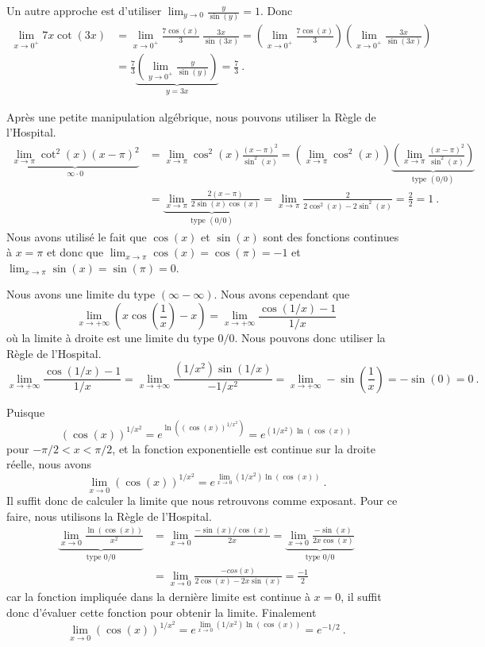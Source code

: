 {Un autre approche est d'utiliser
$\displaystyle \lim_{y\to 0} \frac{y}{\sin(y)} = 1$.  Donc
\begin{align*}
\lim_{x\to 0^+} 7x \cot(3x) &
= \lim_{x\to 0^+} \frac{7\cos(x)}{3}\ \frac{3x}{\sin(3x)}
= \left(\lim_{x\to 0^+} \frac{7\cos(x)}{3}\right)
\left( \lim_{x\to 0^+}\frac{3x}{\sin(3x)}\right) \\
&= \frac{7}{3} \underbrace{\left(\lim_{y\to 0^+}\frac{y}{\sin(y)}\right)}_{y=3x}
= \frac{7}{3} \ .
\end{align*}

 Après une petite manipulation algébrique, nous pouvons
utiliser la Règle de l'Hospital.
\begin{align*}
\underbrace{\lim_{x\to \pi} \cot^2(x) (x-\pi)^2}_{\infty \cdot 0} &
= \lim_{x\to \pi} \cos^2(x) \frac{(x-\pi)^2}{\sin^2(x)}
= \left( \lim_{x\to \pi} \cos^2(x) \right)
\underbrace{\left(\lim_{x\to \pi}\frac{(x-\pi)^2}{\sin^2(x)
}\right)}_{ \text{type }(0/0)} \\
&= \underbrace{\lim_{x\to  \pi}
\frac{2(x-\pi)}{2\sin(x)\cos(x)}}_{\text{type }(0/0)}
= \lim_{x\to \pi}\frac{2}{2\cos^2(x) - 2\sin^2(x)} = \frac{2}{2} = 1 \ . 
\end{align*}
Nous avons utilisé le fait que $\cos(x)$ et $\sin(x)$ sont des fonctions
continues à $x= \pi$ et donc
que $\displaystyle \lim_{x\to \pi}\cos(x) = \cos(\pi) = -1$ et
$\displaystyle \lim_{x\to \pi}\sin(x) = \sin(\pi) = 0$.

 Nous avons une limite du type $(\infty - \infty)$.  Nous
avons cependant que
\[
\lim_{x\to +\infty} \left( x  \cos\left(\frac{1}{x}\right) - x \right)
= \lim_{x\to +\infty} \frac{\cos(1/x)-1}{1/x}
\]
où la limite à droite est une limite du type $0/0$.  Nous pouvons donc
utiliser la Règle de l'Hospital.
\[
\lim_{x\to +\infty} \frac{\cos(1/x)-1}{1/x}
= \lim_{x\to +\infty} \frac{(1/x^2) \sin(1/x)}{-1/x^2}
= \lim_{x\to +\infty} -\sin\left(\frac{1}{x}\right) = -\sin(0) = 0 \ .
\]

 Puisque
\[
(\cos(x))^{1/x^2} = e^{\ln( (\cos(x))^{1/x^2})} =  e^{(1/x^2)\ln(\cos(x))}
\]
pour $-\pi/2 < x < \pi/2$, et la fonction exponentielle est continue
sur la droite réelle, nous avons 
\[
\lim_{x\to 0} (\cos(x))^{1/x^2}
= e^{\lim_{x\to 0} (1/x^2)\ln(\cos(x))} \ .
\]
Il suffit donc de calculer la limite que nous retrouvons comme exposant.
Pour ce faire, nous utilisons la Règle de l'Hospital.
\begin{align*}
\underbrace{\lim_{x\to 0} \frac{\ln(\cos(x))}{x^2}}_{\text{type }0/0}
&= \lim_{x\to 0} \frac{-\sin(x) / \cos(x)}{2x}
= \underbrace{\lim_{x\to 0} \frac{-\sin(x)}{2x \cos(x)}}_{\text{type }0/0} \\
&= \lim_{x\to 0} \frac{-cos(x)}{2\cos(x) - 2x \sin(x)}
= \frac{-1}{2}
\end{align*}
car la fonction impliquée dans la dernière limite est continue à
$x=0$, il suffit donc d'évaluer cette fonction pour 
obtenir la limite.  Finalement
\[
\lim_{x\to 0} (\cos(x))^{1/x^2} = e^{\lim_{x\to 0} (1/x^2)\ln(\cos(x))}
= e^{-1/2} \ .
\]
}

